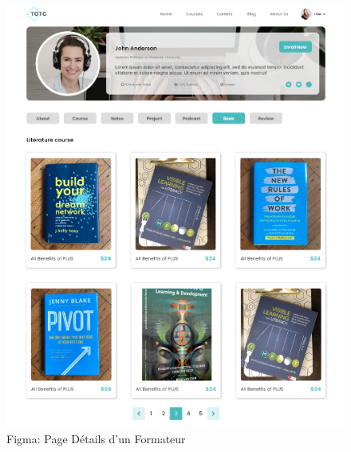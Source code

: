 \begin{figure}[H]
    \centering
    \begin{minipage}{0.45\textwidth}
        \centering
        \includegraphics[width=\textwidth]{Figures/AuthorDetails.PNG}
        \caption{Figma: Page Détails d'un Formateur}
    \end{minipage}
    \hfill
    \begin{minipage}{0.45\textwidth}
        \centering

\end{minipage}
\end{figure}
